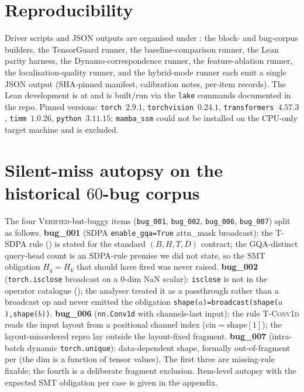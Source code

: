 \section{Reproducibility}\label{app:repro}
Driver scripts and JSON outputs are organised under
: the block- and bug-corpus builders,
the TensorGuard runner, the baseline-comparison runner, the
Lean parity harness, the Dynamo-correspondence runner, the
feature-ablation runner, the localisation-quality runner, and
the hybrid-mode runner each emit a single JSON output
(SHA-pinned manifest, calibration notes, per-item records). The
Lean development is at 
and is built/run via the \texttt{lake} commands documented in
the repo. Pinned versions: \texttt{torch}~$2.9.1$,
\texttt{torchvision}~$0.24.1$, \texttt{transformers}~$4.57.3$,
\texttt{timm}~$1.0.26$, \texttt{python}~$3.11.15$;
\texttt{mamba\_ssm} could not be installed on the CPU-only
target machine and is excluded.

\section{Silent-miss autopsy on the historical $60$-bug corpus}
\label{app:silent-miss}
The four \textsc{Verified}-but-buggy items
(\texttt{bug\_001}, \texttt{bug\_002}, \texttt{bug\_006},
\texttt{bug\_007}) split as follows.
\textbf{bug\_001} (SDPA \texttt{enable\_gqa=True} attn\_mask
broadcast): the \textsc{T-SDPA} rule ()
is stated for the standard $(B,H,T,D)$ contract; the
GQA-distinct query-head count is an SDPA-rule premise we did
not state, so the SMT obligation $H_q=H_k$ that should have
fired was never raised.
\textbf{bug\_002} (\texttt{torch.isclose} broadcast on a
$0$-dim NaN scalar): \texttt{isclose} is not in the operator
catalogue (); the analyser treated it
as a passthrough rather than a broadcast op and never emitted
the obligation \texttt{shape($a$)=broadcast(shape($a$),shape($b$))}.
\textbf{bug\_006} (\texttt{nn.Conv1d}
with channels-last input): the rule \textsc{T-Conv1d} reads the
input layout from a positional channel index ($\mathrm{cin}=
\mathrm{shape}[1]$); the layout-misordered repro lay outside
the layout-fixed fragment.
\textbf{bug\_007} (intra-batch dynamic
\texttt{torch.unique}): data-dependent shape, formally
out-of-fragment per
 (the dim is a function of tensor values).
The first three are missing-rule fixable; the fourth is a
deliberate fragment exclusion. Item-level autopsy with the
expected SMT obligation per case is given in the appendix.

